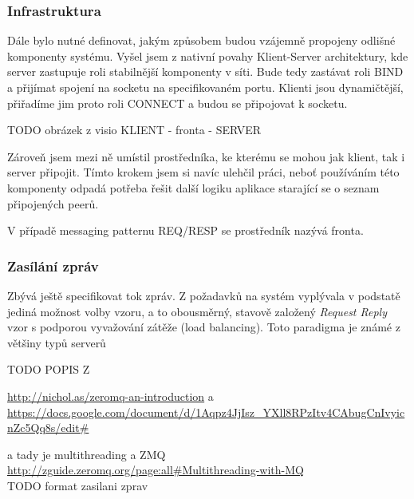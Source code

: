 \documentclass[thesis=M,czech]{FITthesis}[2014/05/07]
\begin{document}
\subsubsection{Infrastruktura}
Dále bylo nutné definovat, jakým způsobem budou vzájemně propojeny odlišné komponenty systému. Vyšel jsem z nativní povahy Klient-Server architektury, kde server zastupuje roli stabilnější komponenty v síti. Bude tedy zastávat roli BIND a přijímat spojení na socketu na specifikovaném portu. Klienti jsou dynamičtější, přiřadíme jim proto roli CONNECT a budou se připojovat k socketu.

TODO obrázek z visio KLIENT - fronta - SERVER

Zároveň jsem mezi ně umístil prostředníka, ke kterému se mohou jak klient, tak i server připojit. Tímto krokem jsem si navíc ulehčil práci, neboť používáním této komponenty odpadá potřeba řešit další logiku aplikace starající se o seznam připojených peerů. 

V případě messaging patternu REQ/RESP se prostředník nazývá fronta.

\subsubsection{Zasílání zpráv}
Zbývá ještě specifikovat tok zpráv. Z požadavků na systém vyplývala v podstatě jediná možnost volby vzoru, a to obousměrný, stavově založený \emph{Request Reply} vzor s podporou vyvažování zátěže (load balancing). Toto paradigma je známé z většiny typů serverů

TODO POPIS Z 

\url{http://nichol.as/zeromq-an-introduction}
a
\url{https://docs.google.com/document/d/1Aqpz4JjIsz_YXll8RPzItv4CAbugCnIvyicnZc5Qq8s/edit#}

a tady je multithreading a ZMQ
\url{http://zguide.zeromq.org/page:all#Multithreading-with-MQ}
\\

TODO format zasilani zprav
\end{document}
